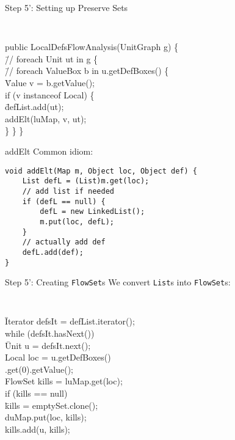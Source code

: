 \begin{slide}{Step 5': Setting up Preserve Sets}
{\small \tt
\begin{tabbing}
public LocalDefsFlowAnalysis(UnitGraph g) \{\\
\quad \= // foreach Unit ut in g \{\\
      \> \quad \= // foreach ValueBox b in u.getDefBoxes() \{\\
      \>       \> \quad \= Value v = b.getValue(); \\
      \>       \> \> if (v instanceof Local) \{ \\
      \>       \> \> \quad \= defList.add(ut); \\
      \>       \> \>       \> addElt(luMap, v, ut);\\
      \>       \> \}
      \> \}
\}
\end{tabbing}
}
\end{slide}

\begin{slide}{addElt}
Common idiom:
{\small 
\begin{verbatim}
void addElt(Map m, Object loc, Object def) {
    List defL = (List)m.get(loc);
    // add list if needed
    if (defL == null) {
        defL = new LinkedList();
        m.put(loc, defL);
    }
    // actually add def
    defL.add(def);
}
\end{verbatim}
}
\end{slide}

\begin{slide}{Step 5': Creating {\tt FlowSet}s}
\vspace*{-0.2in}
We convert {\tt List}s into {\tt FlowSet}s:
{ \tt \small
\begin{tabbing}
\quad \= Iterator defsIt = defList.iterator(); \\
      \> while (defsIt.hasNext())\\
      \> \qquad \= Unit u = defsIt.next();\\
      \>       \> Local loc = u.getDefBoxes() \\
      \>       \> \qquad \qquad .get(0).getValue();\\
      \>       \> FlowSet kills = luMap.get(loc);\\
      \>       \> if (kills == null) \\
      \>       \> \qquad \= kills = emptySet.clone(); \\
      \>       \>        \> duMap.put(loc, kills); \\
      \>       \> {\green kills.add(u, kills);} \\
\end{tabbing}
}
\end{slide}

